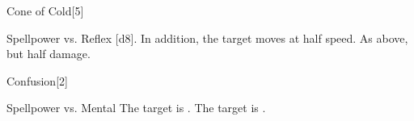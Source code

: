 \begin{spellsection}[Greater]{Cone of Cold}[5]
    \begin{spellheader}
    \end{spellheader}
    \begin{spellcontent}
        \begin{spelltargetinginfo}
        \end{spelltargetinginfo}
        \begin{spelleffects}
            \begin{spellattack}{Spellpower vs. Reflex}
                \spellsuccess {}[d8]. In addition, the target moves at half speed.
                \spellfailure As above, but half damage.
            \end{spellattack}
        \end{spelleffects}
    \end{spellcontent}
    \begin{spellfooter}
        \miscastexplode
    \end{spellfooter}
\end{spellsection}

\begin{spellsection}{Confusion}[2]
    \begin{spellheader}
    \end{spellheader}
    \begin{spellcontent}
        \begin{spelltargetinginfo}
        \end{spelltargetinginfo}
        \begin{spelleffects}
            \begin{spellattack}{Spellpower vs. Mental}
                \spellsuccess The target is \disoriented.
                \spellcritical The target is \confused.
            \end{spellattack}
            \spelldur \durbrief
        \end{spelleffects}
    \end{spellcontent}
    \begin{spellfooter}
        \miscastrandom
    \end{spellfooter}
\end{spellsection}

